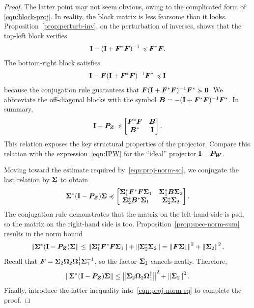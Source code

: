 \documentclass[final]{siamltex}
\newcommand{\pgnotate}[1]{{\color{blue}[#1]}}
\begin{document}
\begin{proof}
The latter point may not seem obvious, owing to the complicated
form of \eqref{eqn:block-proj}.  In reality, the block matrix is
less fearsome than it looks.  Proposition~\ref{prop:perturb-inv},
on the perturbation of inverses, shows that the top-left block
verifies
$$
\mathbf{I} - (\mathbf{I} + \bm{F}^* \bm{F})^{-1} \preccurlyeq \bm{F}^*
\bm{F}.
$$
The bottom-right block satisfies
$$
\mathbf{I} - \bm{F}(\mathbf{I} + \bm{F}^* \bm{F})^{-1} \bm{F}^* \preccurlyeq
\mathbf{I}
$$
because the conjugation rule guarantees that $\bm{F}(\mathbf{I} +
\bm{F}^* \bm{F})^{-1} \bm{F}^* \succcurlyeq \bm{0}$.
We abbreviate the off-diagonal blocks with the symbol
$\bm{B} = -(\mathbf{I} + \bm{F}^*
\bm{F})^{-1}\bm{F}^*$. In summary,
$$
\mathbf{I} - \bm{P}_{\bm{Z}}
    \preccurlyeq \begin{bmatrix} \bm{F}^* \bm{F} & \bm{B} \\
        \bm{B}^* & \mathbf{I} \end{bmatrix}.
$$
This relation exposes the key structural properties of the projector.
Compare this relation with the expression~\eqref{eqn:IPW}
for the ``ideal'' projector $\mathbf{I} - \bm{P}_{\bm{W}}$.

Moving toward the estimate required by~\eqref{eqn:proj-norm-sq}, we conjugate the last relation
by $\bm{\Sigma}$ to obtain
$$
\bm{\Sigma}^* (\mathbf{I} - \bm{P}_{\bm{Z}}) \bm{\Sigma}
    \preccurlyeq \begin{bmatrix} \bm{\Sigma}_1^* \bm{F}^* \bm{F} \bm{\Sigma}_1
        & \bm{\Sigma}_1^* \bm{B} \bm{\Sigma}_2 \\
        \bm{\Sigma}_2^* \bm{B}^* \bm{\Sigma}_1
        & \bm{\Sigma}_2^* \bm{\Sigma}_2 \end{bmatrix}.
$$
The conjugation rule demonstrates that the matrix on the left-hand
side is psd, so the matrix on the right-hand side is too.
Proposition~\ref{prop:spec-norm-sum} results in the norm bound
$$
\left\Vert { \bm{\Sigma}^*(\mathbf{I}- \bm{P}_{\bm{Z}}) \bm{\Sigma} } \right\Vert
    \leq \left\Vert { \bm{\Sigma}_1^*\bm{F}^*\bm{F} \bm{\Sigma}_1 } \right\Vert
        + \left\Vert { \bm{\Sigma}_2^*\bm{\Sigma}_2 } \right\Vert
    = \left\Vert {\bm{F} \bm{\Sigma}_1} \right\Vert^2 + \left\Vert { \bm{\Sigma}_2 } \right\Vert^2.
$$
Recall that $\bm{F} = \bm{\Sigma}_2 \bm{\Omega}_2
\bm{\Omega}_1^\dagger \bm{\Sigma}_1^{-1}$, so the factor
$\bm{\Sigma}_1$ cancels neatly.
Therefore,
$$
\left\Vert { \bm{\Sigma}^*(\mathbf{I}- \bm{P}_{\bm{Z}}) \bm{\Sigma}} \right\Vert
    \leq {\bigl\Vert {\bm{\Sigma}_2 \bm{\Omega}_2 \bm{\Omega}_1^\dagger} \bigr\Vert}_{}^2 + \left\Vert {\bm{\Sigma}_2} \right\Vert^2.
$$
Finally, introduce the latter inequality into~\eqref{eqn:proj-norm-sq} to complete the proof.
\end{proof}
\end{document}
